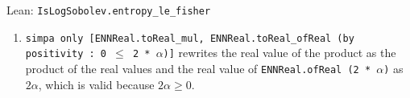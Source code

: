 \documentclass[11pt,a4paper]{article}
\begin{document}
\begin{leanbox}{Lean: \texttt{IsLogSobolev.\allowbreak{}entropy\_\allowbreak{}le\_\allowbreak{}fisher}}
\begin{enumerate}
\item \texttt{simpa only [ENNReal.\allowbreak{}to\allowbreak{}Real\_\allowbreak{}mul, ENNReal.\allowbreak{}to\allowbreak{}Real\_\allowbreak{}of\allowbreak{}Real (by positivity : 0 \ensuremath{\le} 2 * \ensuremath{\alpha})]} rewrites the real value of the product as the product of the real values and the real value of \texttt{ENNReal.\allowbreak{}of\allowbreak{}Real (2 * \ensuremath{\alpha})} as \(2\alpha\), which is valid because \(2\alpha\ge0\).

\end{enumerate}
\end{leanbox}
\end{document}
